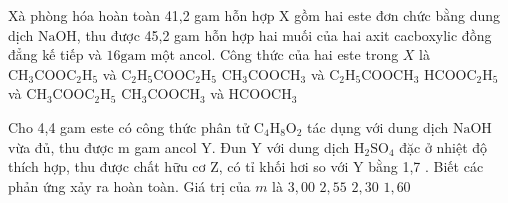 \begin{ex}[2][]
	Xà phòng hóa hoàn toàn 41,2 gam hỗn hợp $\mathrm{X}$ gồm hai este đơn chức bằng dung dịch $\mathrm{NaOH}$, thu được 45,2 gam hỗn hợp hai muối của hai axit cacboxylic đồng đẳng kế tiếp và $16 \mathrm{gam}$ một ancol. Công thức của hai este trong $X$ là                                                          
	\choice
	{%
		$\mathrm{CH}_3 \mathrm{COOC}_2 \mathrm{H}_5$ và $\mathrm{C}_2 \mathrm{H}_5 \mathrm{COOC}_2 \mathrm{H}_5$
	}
	{%
		\True $\mathrm{CH}_3 \mathrm{COOCH}_3$ và $\mathrm{C}_2 \mathrm{H}_5 \mathrm{COOCH}_3$
	}
	{%
		$\mathrm{HCOOC}_2 \mathrm{H}_5$ và $\mathrm{CH}_3 \mathrm{COOC}_2 \mathrm{H}_5$
	}
	{%
		$\mathrm{CH}_3 \mathrm{COOCH}_3$ và $\mathrm{HCOOCH}_3$
	}
	\sodongkeex[5]
\end{ex}
\begin{ex}[3][]
	Cho 4,4 gam este có công thức phân tử $\mathrm{C}_4 \mathrm{H}_8 \mathrm{O}_2$ tác dụng với dung dịch $\mathrm{NaOH}$ vừa đủ, thu được $\mathrm{m}$ gam ancol $\mathrm{Y}$. Đun $\mathrm{Y}$ với dung dịch $\mathrm{H}_2 \mathrm{SO}_4$ đặc ở nhiệt độ thích hợp, thu được chất hữu cơ $\mathrm{Z}$, có tỉ khối hơi so với Y bằng 1,7 . Biết các phản ứng xảy ra hoàn toàn. Giá trị của $m$ là                                                       
	\choice
	{%
	\True	$ 3,00 $
	}
	{%
		$ 2,55 $
	}
	{%
		$2,30$
	}
	{%
		$1,60$
	}
	\sodongkeex[5]
\end{ex}
